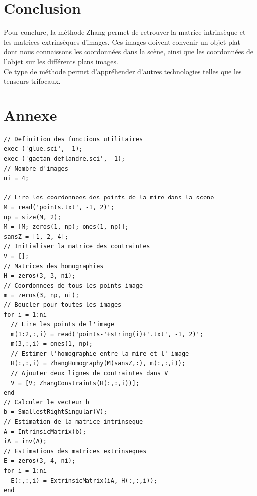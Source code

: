 \documentclass[a4paper,11pt]{article}
\begin{document}
\section{Conclusion}

Pour conclure, la méthode Zhang permet de retrouver la matrice intrinsèque et les 
matrices extrinsèques d'images. Ces images doivent convenir un objet plat dont nous 
connaissons les coordonnées dans la scène, ainsi que les coordonnées de l'objet sur 
les différents plans images.\\

Ce type de méthode permet d'appréhender d'autres technologies telles que les tenseurs 
trifocaux.

\section{Annexe}

\begin{lstlisting}[caption=Macro générale qui va appeler les fonctions]
// Definition des fonctions utilitaires
exec ('glue.sci', -1);
exec ('gaetan-deflandre.sci', -1);
// Nombre d'images
ni = 4;

// Lire les coordonnees des points de la mire dans la scene
M = read('points.txt', -1, 2)';
np = size(M, 2);
M = [M; zeros(1, np); ones(1, np)];
sansZ = [1, 2, 4];
// Initialiser la matrice des contraintes
V = [];
// Matrices des homographies
H = zeros(3, 3, ni);
// Coordonnees de tous les points image
m = zeros(3, np, ni);
// Boucler pour toutes les images
for i = 1:ni
  // Lire les points de l'image
  m(1:2,:,i) = read('points-'+string(i)+'.txt', -1, 2)';
  m(3,:,i) = ones(1, np);
  // Estimer l'homographie entre la mire et l' image
  H(:,:,i) = ZhangHomography(M(sansZ,:), m(:,:,i));
  // Ajouter deux lignes de contraintes dans V
  V = [V; ZhangConstraints(H(:,:,i))];
end
// Calculer le vecteur b
b = SmallestRightSingular(V);
// Estimation de la matrice intrinseque
A = IntrinsicMatrix(b);
iA = inv(A);
// Estimations des matrices extrinseques
E = zeros(3, 4, ni);
for i = 1:ni
  E(:,:,i) = ExtrinsicMatrix(iA, H(:,:,i));
end
\end{lstlisting}
\end{document}
